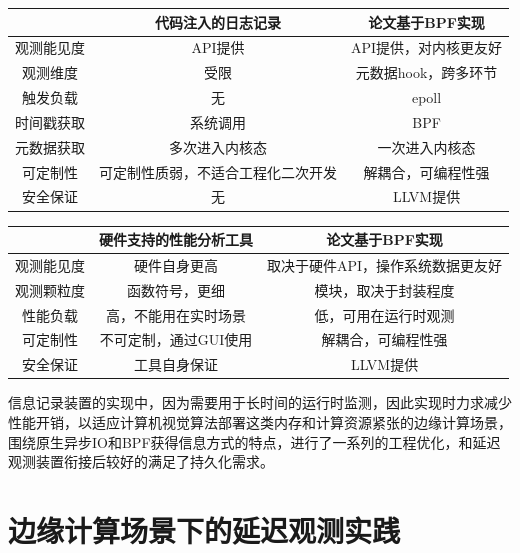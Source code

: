 \documentclass[master,anonymous]{shtthesis}
\begin{document}
\begin{table}[htbp]
	\centering
	\label{对比代码注入日志方式}
	\begin{tabular}{ccc}
	\toprule
	   & 代码注入的日志记录 & 论文基于BPF实现 \\
	\midrule
	观测能见度 & API提供 & API提供，对内核更友好\\
	观测维度   & 受限  & 元数据hook，跨多环节  \\ 
	触发负载 & 无 & epoll \\
	时间戳获取 & 系统调用 & BPF \\
	元数据获取 & 多次进入内核态 & 一次进入内核态 \\
	可定制性 & 可定制性质弱，不适合工程化二次开发 & 解耦合，可编程性强\\
	安全保证 & 无 & LLVM提供 \\
	\bottomrule
	\end{tabular}
\end{table}

\begin{table}[htbp]
	\centering
	\label{对比硬件支持的性能分析工具}
	\begin{tabular}{ccc}
		\toprule
		& 硬件支持的性能分析工具 & 论文基于BPF实现 \\
		\midrule
		观测能见度 & 硬件自身更高 & 取决于硬件API，操作系统数据更友好\\
		观测颗粒度   & 函数符号，更细  & 模块，取决于封装程度  \\ 
		性能负载 & 高，不能用在实时场景 & 低，可用在运行时观测 \\
		可定制性 & 不可定制，通过GUI使用 & 解耦合，可编程性强\\
		安全保证 & 工具自身保证 & LLVM提供 \\
		\bottomrule
	\end{tabular}
\end{table}

信息记录装置的实现中，因为需要用于长时间的运行时监测，因此实现时力求减少性能开销，以适应计算机视觉算法部署这类内存和计算资源紧张的边缘计算场景，围绕原生异步IO和BPF获得信息方式的特点，进行了一系列的工程优化，和延迟观测装置衔接后较好的满足了持久化需求。

\chapter{边缘计算场景下的延迟观测实践}
\end{document}
